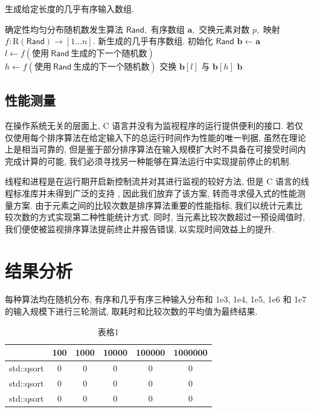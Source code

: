 \documentclass[12pt]{article}
\begin{document}
\begin{algorithm}
\caption{生成给定长度的几乎有序输入数组.}
\label{algo_gen_almost_rising}
\begin{algorithmic}[1]
\Require 确定性均匀分布随机数发生算法 $\mathsf{Rand},$ 有序数组 $\bm{a},$ 交换元素对数 $p,$ 映射 $f: \mathrm{R}(\mathsf{Rand}) \to [1 \dots n].$
\Ensure 新生成的几乎有序数组.
\State 初始化 $\mathsf{Rand}$
\State $\bm{b} \gets \bm{a}$
    \State $l \gets f(\text{使用}\ \mathsf{Rand}\ \text{生成的下一个随机数})$
    \State $h \gets f(\text{使用}\ \mathsf{Rand}\ \text{生成的下一个随机数})$
    \State 交换 $\bm{b}[l]$ 与 $\bm{b}[h]$
\EndFor
\State \Return $\bm{b}$
\end{algorithmic}
\end{algorithm}

\subsection{性能测量}

在操作系统无关的层面上, C 语言并没有为监视程序的运行提供便利的接口. 若仅仅使用每个排序算法在给定输入下的总运行时间作为性能的唯一判据, 虽然在理论上是相当可靠的, 但是鉴于部分排序算法在输入规模扩大时不具备在可接受时间内完成计算的可能, 我们必须寻找另一种能够在算法运行中实现提前停止的机制.

线程和进程是在运行期开启新控制流并对其进行监视的较好方法, 但是 C 语言的线程标准库并未得到广泛的支持 \cite{bib_msvc_threads}, 因此我们放弃了该方案, 转而寻求侵入式的性能测量方案. 由于元素之间的比较次数是排序算法重要的性能指标, 我们以统计元素比较次数的方式实现第二种性能统计方式. 同时, 当元素比较次数超过一预设阈值时, 我们便使被监视排序算法提前终止并报告错误, 以实现时间效益上的提升.

\section{结果分析}

每种算法均在随机分布, 有序和几乎有序三种输入分布和 1e3, 1e4, 1e5, 1e6 和 1e7 的输入规模下进行三轮测试, 取耗时和比较次数的平均值为最终结果.

\begin{table}[H]
    \centering
    \begin{tabular}{cccccc}
        \toprule
        &100&1000&10000&100000&1000000 \\
        \midrule
        std::qsort&0&0&0&0&0 \\
        std::qsort&0&0&0&0&0 \\
        std::qsort&0&0&0&0&0 \\
        \bottomrule
    \end{tabular}
\caption{表格1}
\end{table}
\end{document}
